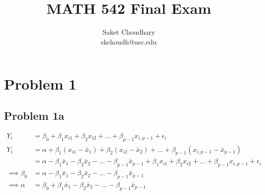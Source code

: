 \documentclass[a4paper]{article}
\title{MATH 542 Final Exam}
\author{Saket Choudhary\\skchoudh@usc.edu}
\begin{document}
\maketitle

\section*{Problem 1}
\subsection*{Problem 1a}

\begin{align*}
Y_i &= \beta_0 + \beta_1 x_{i1} + \beta_2 x_{i2} + \dots + \beta_{p-1}x_{i,p-1} + \epsilon_i\\
Y_i &= \alpha + \beta_1(x_{i1}-\bar{x}_1) + \beta_2(x_{i2} - \bar{x}_2) + \dots + \beta_{p-1}(x_{i,p-1}-\bar{x}_{p-1})\\
&= \alpha - \beta_1 \bar{x}_1 -\beta_2 \bar{x}_2 - \dots - \beta_{p-1}\bar{x}_{p-1} + \beta_1 x_{i1} + \beta_2 x_{i2} + \dots + \beta_{p-1}x_{i,p-1} + \epsilon_i\\
\implies \beta_0 &= \alpha - \beta_1 \bar{x}_1 -\beta_2 \bar{x}_2 - \dots - \beta_{p-1}\bar{x}_{p-1}\\
\implies \alpha &= \beta_0 + \beta_1 \bar{x}_1 -\beta_2 \bar{x}_2 - \dots - \beta_{p-1}\bar{x}_{p-1}
\end{align*}
\end{document}
